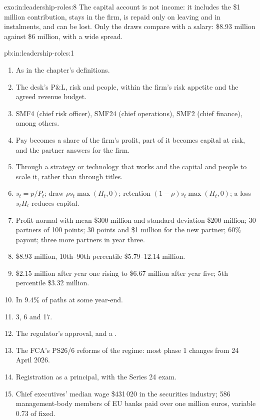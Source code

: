 \begin{solution}{exo:in:leadership-roles:8}
The capital account is not income: it includes the \$1 million contribution, stays in the firm, is repaid only on
leaving and in instalments, and can be lost. Only the draws compare with a salary: \$8.93 million against \$6 million,
with a wide spread.
\end{solution}

\begin{solution}{pb:in:leadership-roles:1}
\begin{enumerate}
\item As in the chapter's definitions.
\item The desk's P\&L, risk and people, within the firm's risk appetite and the agreed revenue budget.
\item SMF4 (chief risk officer), SMF24 (chief operations), SMF2 (chief finance), among others.
\item Pay becomes a share of the firm's profit, part of it becomes capital at risk, and the partner answers for the firm.
\item Through a strategy or technology that works and the capital and people to scale it, rather than through titles.
\item $s_t=p/P_t$; draw $\rho s_t\max(\Pi_t,0)$; retention $(1-\rho)s_t\max(\Pi_t,0)$; a loss $s_t\Pi_t$ reduces capital.
\item Profit normal with mean \$300 million and standard deviation \$200 million; 30 partners of 100 points; 30 points
and \$1 million for the new partner; 60\% payout; three more partners in year three.
\item \$8.93 million, 10th--90th percentile \$5.79--12.14 million.
\item \$2.15 million after year one rising to \$6.67 million after year five; 5th percentile \$3.32 million.
\item In 9.4\% of paths at some year-end.
\item 3, 6 and 17.
\item The regulator's approval, and a .
\item The FCA's PS26/6 reforms of the regime: most phase 1 changes from 24 April 2026.
\item Registration as a principal, with the Series 24 exam.
\item Chief executives' median wage \$431\,020 in the securities industry; 586 management-body members of EU banks paid over
one million euros, variable 0.73 of fixed.

\end{enumerate}
\end{solution}
